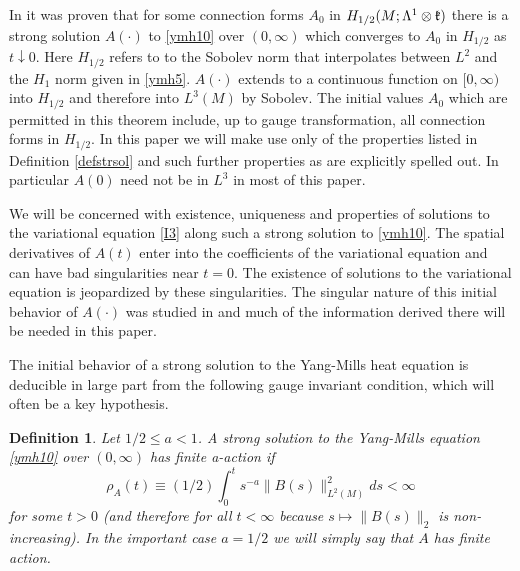 \documentclass[12pt]{article}
\newtheorem{definition}[theorem]{Definition}
\def \L{\Lambda}
\def \kf{\frak k}
\def \beq{\begin{equation}}
\def \eeq{\end{equation}}
\def \eref{\eqref}
\numberwithin{equation}{section}
\begin{document}
 In \cite{G70} it was proven that for some connection forms 
 $A_0$ in $H_{1/2}(M;\L^1\otimes \kf)$ 
 there is a strong solution $A(\cdot)$   to \eref{ymh10} over  
 $(0, \infty)$ which converges to $A_0$ in $H_{1/2}$ as $t\downarrow 0$.  Here $H_{1/2}$ refers to
 to the Sobolev norm that interpolates between $L^2$ and  the $H_1$ norm given in \eref{ymh5}. 
 $A(\cdot)$ 
 extends to a continuous function on $[0,\infty)$ into $H_{1/2}$ and therefore into $L^3(M)$
 by Sobolev. The initial values $A_0$ which are permitted in this theorem include,
  up to gauge transformation,
  all connection forms in $H_{1/2}$. 
         In this paper we will make use only of the properties listed in Definition \ref{defstrsol} and
         such further properties as are explicitly spelled out. In particular $A(0)$ need not
          be in $L^3$ in most of this  paper.
  
   We will be concerned 
   with existence, uniqueness and
  properties of solutions to the variational equation \eref{I3} along such
   a strong solution to \eref{ymh10}.  The spatial derivatives of  $A(t)$ enter into
    the coefficients of the variational
   equation and  can have bad singularities near $t =0$. 
   The existence of solutions to the variational equation is 
    jeopardized by these singularities. 
   The singular nature of this initial behavior of $A(\cdot)$ was studied in \cite{G70} and much  
   of the     information derived  there  will be needed in this paper.   

The initial behavior of a strong solution to the Yang-Mills heat equation is deducible in large part 
from the following gauge invariant condition, which will often be a key hypothesis.
             \begin{definition}{\rm  \label{defa-act} Let $1/2\le a <1$. A strong solution to
 the Yang-Mills equation \eref{ymh10}  over $(0,\infty)$ has 
 {\it finite a-action} if
 \beq
  \rho_A(t) \equiv (1/2)\int_0^t s^{-a} \|B(s)\|_{L^2(M)}^2 ds < \infty  \label{ymh15a} 
  \eeq 
   for some $t >0$ (and therefore for all $t <\infty$ because $s \mapsto \|B(s)\|_2$ is non-increasing).
  In the important case $a = 1/2$ we will simply say that  $A$ has finite action.
  }
  \end{definition}
\end{document}
